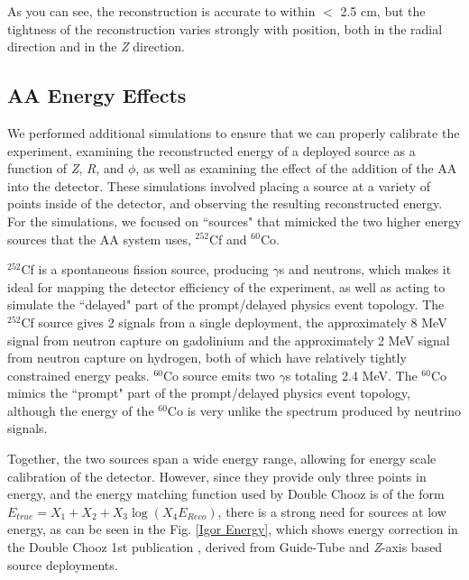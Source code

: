 As you can see, the reconstruction is accurate to within $<$ 2.5 cm, but the tightness of the reconstruction varies strongly with position, both in the radial direction and in the \emph{Z} direction. 

\subsection{AA Energy Effects}
We performed additional simulations to ensure that we can properly calibrate the experiment, examining the reconstructed energy of a deployed source as a function of \emph{Z}, \emph{R}, and $\phi$, as well as examining the effect of the addition of the AA into the detector. These simulations involved placing a source at a variety of points inside of the detector, and observing the resulting reconstructed energy. For the simulations, we focused on ``sources" that mimicked the two higher energy sources that the AA system uses, $^{252}$Cf and $^{60}$Co. 

$^{252}$Cf is a spontaneous fission source, producing $ \gamma$s and neutrons, which makes it ideal for mapping the detector efficiency of the experiment, as well as acting to simulate the ``delayed" part of the prompt/delayed physics event topology. The $^{252}$Cf source gives 2 signals from a single deployment, the approximately 8 MeV signal from neutron capture on gadolinium and the approximately 2 MeV signal from neutron capture on hydrogen, both of which have relatively tightly constrained energy peaks. $^{60}$Co source emits two $\gamma$s totaling 2.4 MeV. The $^{60}$Co mimics the ``prompt" part of the prompt/delayed physics event topology, although the energy of the $^{60}$Co is very unlike the spectrum produced by neutrino signals. 

Together, the two sources span a wide energy range, allowing for energy scale calibration of the detector. However, since they provide only three points in energy, and the energy matching function used by Double Chooz is of the form $E_{true} =X_1 + X_2 + X_3 \log(X_4 E_{Reco})$, there is a strong need for sources at low energy, as can be seen in the Fig. \ref{Igor Energy}, which shows energy correction in the Double Chooz 1st publication \cite{DC_2012}, derived from Guide-Tube and \emph{Z}-axis based source deployments. 


